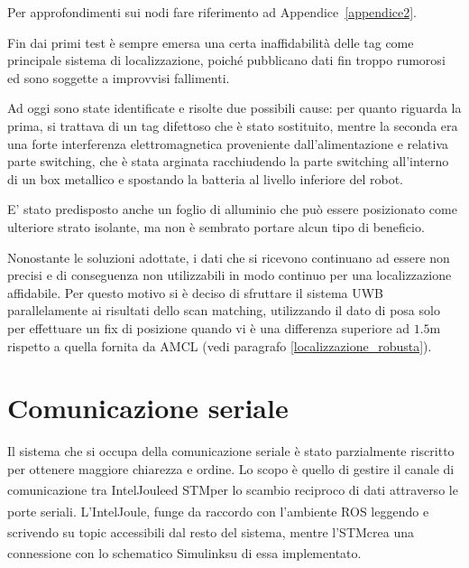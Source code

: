 Per approfondimenti sui nodi fare riferimento ad Appendice~\ref{appendice2}.

\bigskip 

Fin dai primi test è sempre emersa una certa inaffidabilità delle tag come principale sistema di localizzazione, poiché pubblicano dati fin troppo rumorosi ed sono soggette a improvvisi fallimenti.

Ad oggi sono state identificate e risolte due possibili cause: per quanto riguarda la prima, si trattava di un tag difettoso che è stato sostituito, mentre la seconda era una forte interferenza elettromagnetica proveniente dall’alimentazione e relativa parte switching, che è stata arginata racchiudendo la parte switching all’interno di un box metallico e spostando la batteria al livello inferiore del robot.

E’ stato predisposto anche un foglio di alluminio che può essere posizionato come ulteriore strato isolante, ma non è sembrato portare alcun tipo di beneficio.

Nonostante le soluzioni adottate, i dati che si ricevono continuano ad essere non precisi e di conseguenza non utilizzabili in modo continuo per una localizzazione affidabile.
Per questo motivo si è deciso di sfruttare il sistema UWB parallelamente ai risultati dello scan matching, utilizzando il dato di posa solo per effettuare un fix di posizione quando vi è una differenza superiore ad $1.5$m rispetto a quella fornita da AMCL (vedi paragrafo \ref{localizzazione_robusta}).

\clearpage


\section{Comunicazione seriale}
\label{comunicazione_seriale}
Il sistema che si occupa della comunicazione seriale è stato parzialmente riscritto per ottenere maggiore chiarezza e ordine. Lo scopo è quello di gestire il canale di comunicazione tra Intel\textsuperscript\textregistered Joule\texttrademark\hspace{1mm}ed STM\textsuperscript\textregistered\hspace{1mm}per lo scambio reciproco di dati attraverso le porte seriali. L'Intel\textsuperscript\textregistered Joule\texttrademark, funge da raccordo con l'ambiente ROS leggendo e scrivendo su topic accessibili dal resto del sistema, mentre l'STM\textsuperscript\textregistered\hspace{1mm}crea una connessione con lo schematico Simulink\textsuperscript\textregistered\hspace{1mm}su di essa implementato. 

